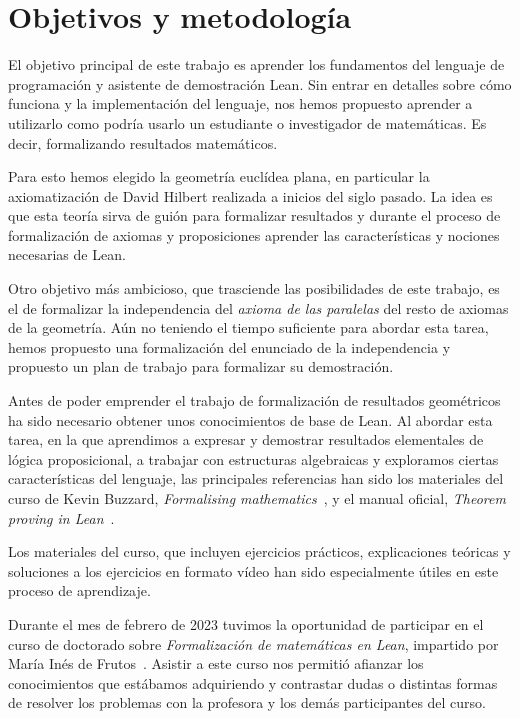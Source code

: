 \section{Objetivos y metodología}

El objetivo principal de este trabajo es aprender los fundamentos del lenguaje
de programación y asistente de demostración Lean. Sin entrar en
detalles sobre cómo funciona y la implementación del lenguaje, nos hemos
propuesto aprender a utilizarlo como podría usarlo un estudiante o investigador de
matemáticas. Es decir, formalizando resultados matemáticos.

Para esto hemos elegido la geometría euclídea plana, en particular la
axiomatización de David Hilbert realizada a inicios del siglo pasado.
La idea es que esta teoría sirva de guión para formalizar resultados y durante
el proceso de formalización de axiomas y proposiciones aprender las
características y nociones necesarias de Lean.

Otro objetivo más ambicioso, que trasciende las posibilidades de este trabajo,
es el de formalizar la independencia del \textit{axioma de las paralelas} del
resto de axiomas de la geometría. Aún no teniendo el tiempo suficiente para
abordar esta tarea, hemos propuesto una formalización del enunciado de la
independencia y propuesto un plan de trabajo para formalizar su demostración.

Antes de poder emprender el trabajo de formalización de resultados geométricos
ha sido necesario obtener unos conocimientos de base de Lean. Al abordar esta
tarea, en la que aprendimos a expresar y demostrar resultados elementales de
lógica proposicional, a trabajar con estructuras algebraicas y exploramos
ciertas características del lenguaje, las principales referencias han sido los
materiales del curso de Kevin Buzzard, \textit{Formalising
	mathematics}~\cite{buzzardFormalisingMathematicsFormalising}, y el manual
oficial, \textit{Theorem proving in Lean}~\cite{avigadLeanTheoremProver}.

Los materiales del curso, que incluyen ejercicios prácticos, explicaciones
teóricas y soluciones a los ejercicios en formato vídeo han sido especialmente
útiles en este proceso de aprendizaje.

Durante el mes de febrero de 2023 tuvimos la oportunidad de participar en el
curso de doctorado sobre \textit{Formalización de matemáticas en Lean},
impartido por María Inés de Frutos~\cite{defrutosFormalizacionMatematicasLean}.
Asistir a este curso nos permitió afianzar los conocimientos que estábamos
adquiriendo y contrastar dudas o distintas formas de resolver los problemas con
la profesora y los demás participantes del curso.

